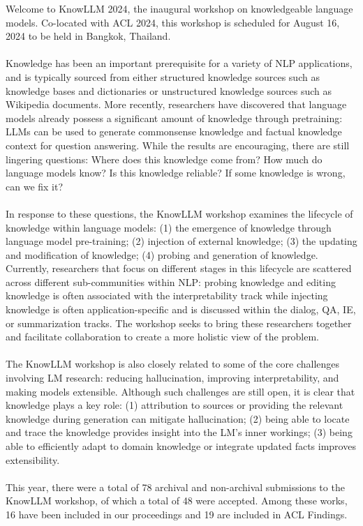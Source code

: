 Welcome to KnowLLM 2024, the inaugural workshop on knowledgeable language models. Co-located with ACL 2024, this workshop is scheduled for August 16, 2024 to be held in Bangkok, Thailand.\\
\\
Knowledge has been an important prerequisite for a variety of NLP applications, and is typically sourced from either structured knowledge sources such as knowledge bases and dictionaries or unstructured knowledge sources such as Wikipedia documents. More recently, researchers have discovered that language models already possess a significant amount of knowledge through pretraining: LLMs can be used to generate commonsense knowledge and factual knowledge context for question answering. While the results are encouraging, there are still lingering questions: Where does this knowledge come from? How much do language models know? Is this knowledge reliable? If some knowledge is wrong, can we fix it?\\
\\
In response to these questions, the KnowLLM workshop examines the lifecycle of knowledge within language models: (1) the emergence of knowledge through language model pre-training; (2) injection of external knowledge; (3) the updating and modification of knowledge; (4) probing and generation of knowledge. Currently, researchers that focus on different stages in this lifecycle are scattered across different sub-communities within NLP: probing knowledge and editing knowledge is often associated with the interpretability track while injecting knowledge is often application-specific and is discussed within the dialog, QA, IE, or summarization tracks. The workshop seeks to bring these researchers together and facilitate collaboration to create a more holistic view of the problem.\\
\\
The KnowLLM workshop is also closely related to some of the core challenges involving LM research: reducing hallucination, improving interpretability, and making models extensible. Although such challenges are still open, it is clear that knowledge plays a key role: (1) attribution to sources or providing the relevant knowledge during generation can mitigate hallucination; (2) being able to locate and trace the knowledge provides insight into the LM's inner workings; (3) being able to efficiently adapt to domain knowledge or integrate updated facts improves extensibility.\\
\\
This year, there were a total of 78 archival and non-archival submissions to the KnowLLM workshop, of which a total of 48 were accepted. Among these works, 16 have been included in our proceedings and 19 are included in ACL Findings.\\
